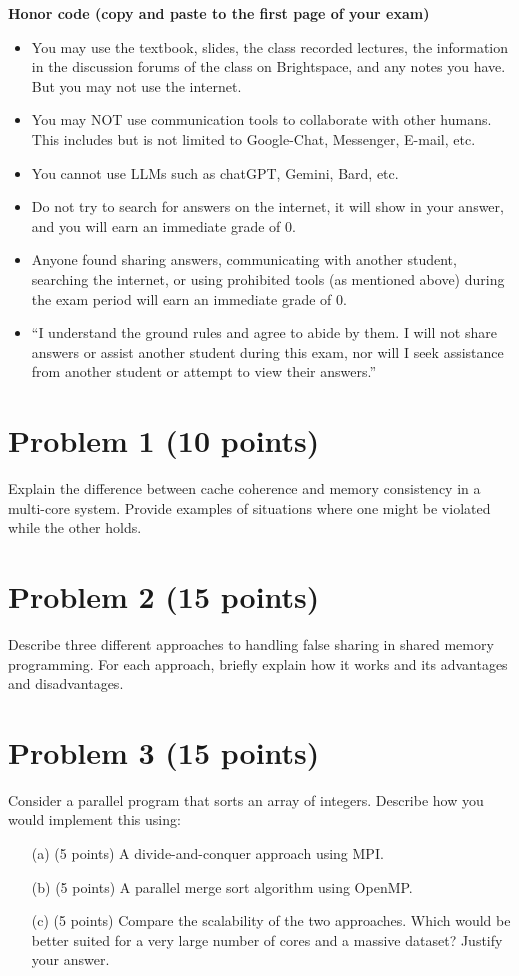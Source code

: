 \documentclass{article}
\begin{document}
\textbf{Honor code (copy and paste to the first page of your exam)}
\begin{itemize}
    \item You may use the textbook, slides, the class recorded lectures, the information in the discussion forums of the class on Brightspace, and any notes you have. But you may not use the internet.
    \item You may NOT use communication tools to collaborate with other humans. This includes but is not limited to Google-Chat, Messenger, E-mail, etc.
    \item You cannot use LLMs such as chatGPT, Gemini, Bard, etc.
    \item Do not try to search for answers on the internet, it will show in your answer, and you will earn an immediate grade of 0.
    \item Anyone found sharing answers, communicating with another student, searching the internet, or using prohibited tools (as mentioned above) during the exam period will earn an immediate grade of 0.
    \item “I understand the ground rules and agree to abide by them. I will not share answers or assist another student during this exam, nor will I seek assistance from another student or attempt to view their answers.”
\end{itemize}


\section*{Problem 1 (10 points)}
Explain the difference between cache coherence and memory consistency in a multi-core system.  Provide examples of situations where one might be violated while the other holds.


\section*{Problem 2 (15 points)}
Describe three different approaches to handling false sharing in shared memory programming.  For each approach, briefly explain how it works and its advantages and disadvantages.


\section*{Problem 3 (15 points)}
Consider a parallel program that sorts an array of integers.  Describe how you would implement this using:
\begin{enumerate}
    \item[(a)] (5 points) A divide-and-conquer approach using MPI.
    \item[(b)] (5 points) A parallel merge sort algorithm using OpenMP.
    \item[(c)] (5 points)  Compare the scalability of the two approaches. Which would be better suited for a very large number of cores and a massive dataset? Justify your answer.
\end{enumerate}
\end{document}

